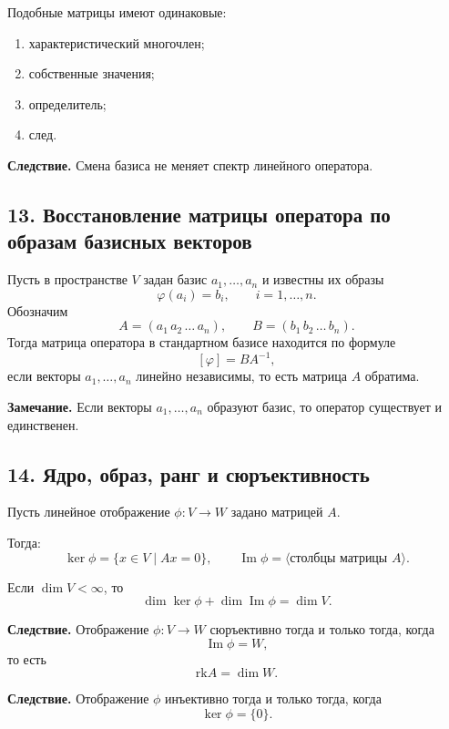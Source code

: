 \begin{theorem}
Подобные матрицы имеют одинаковые:
\begin{enumerate}
    \item характеристический многочлен;
    \item собственные значения;
    \item определитель;
    \item след.
\end{enumerate}
\end{theorem}

\noindent
\textbf{Следствие.}
Смена базиса не меняет спектр линейного оператора.

\subsection*{13. Восстановление матрицы оператора по образам базисных векторов}

Пусть в пространстве $V$ задан базис $a_1,\dots,a_n$ и известны их образы
\[
\varphi(a_i)=b_i,\qquad i=1,\dots,n.
\]
Обозначим
\[
A=(a_1\,a_2\,\dots\,a_n),\qquad B=(b_1\,b_2\,\dots\,b_n).
\]
Тогда матрица оператора в стандартном базисе находится по формуле
\[
[\varphi]=BA^{-1},
\]
если векторы $a_1,\dots,a_n$ линейно независимы, то есть матрица $A$ обратима.

\noindent
\textbf{Замечание.}
Если векторы $a_1,\dots,a_n$ образуют базис, то оператор существует и единственен.

\subsection*{14. Ядро, образ, ранг и сюръективность}

Пусть линейное отображение $\phi:V\to W$ задано матрицей $A$.

Тогда:
\[
\ker \phi=\{x\in V\mid Ax=0\},
\qquad
\operatorname{Im}\phi=\langle \text{столбцы матрицы }A\rangle.
\]

\begin{theorem}
Если $\dim V<\infty$, то
\[
\dim\ker\phi+\dim\operatorname{Im}\phi=\dim V.
\]
\end{theorem}

\noindent
\textbf{Следствие.}
Отображение $\phi:V\to W$ сюръективно тогда и только тогда, когда
\[
\operatorname{Im}\phi=W,
\]
то есть
\[
\mathrm{rk} A=\dim W.
\]

\noindent
\textbf{Следствие.}
Отображение $\phi$ инъективно тогда и только тогда, когда
\[
\ker\phi=\{0\}.
\]

